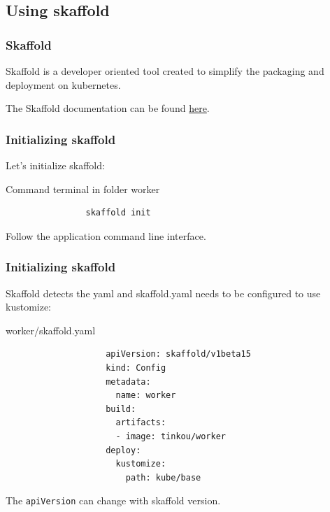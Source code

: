 \subsection{Using skaffold}	
	
	\begin{frame}
		\frametitle{Skaffold}
		
		Skaffold is a developer oriented tool created to simplify the packaging and deployment on kubernetes.
		
		\medskip
		The Skaffold documentation can be found \href{https://github.com/GoogleContainerTools/skaffold}{here}.

	\end{frame}
	
	\begin{frame}[fragile]
		\frametitle{Initializing skaffold}
		
		Let's initialize skaffold:
		\begin{block}{Command terminal in folder worker}
			\begin{verbatim}
				skaffold init
			\end{verbatim}
			Follow the application command line interface.
		\end{block}
	\end{frame}
	
	\begin{frame}[fragile]
		\frametitle{Initializing skaffold}

		Skaffold detects the yaml and skaffold.yaml needs to be configured to use kustomize:
		\begin{block}{worker/skaffold.yaml}
			\begin{footnotesize}
				\begin{verbatim}
					apiVersion: skaffold/v1beta15
					kind: Config
					metadata:
					  name: worker
					build:
					  artifacts:
					  - image: tinkou/worker
					deploy:
					  kustomize:
					    path: kube/base
				\end{verbatim}						
			\end{footnotesize}
		\end{block}
		The \verb!apiVersion! can change with skaffold version.
	\end{frame}
	
